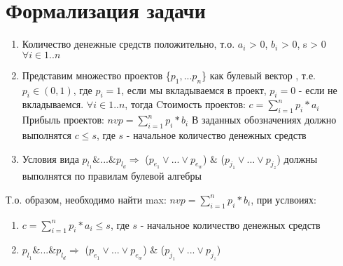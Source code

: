 \documentclass[a4paper,12pt]{article}
\begin{document}
\section{Формализация задачи}
\begin{enumerate}
\item 
Количество денежные средств положительно, т.о.
\newline   
${a_i}$ > 0, ${b_i}$ > 0, s > 0 $\forall i \in {1..n}$
\item 
Представим множество проектов  \{${p_{1},...p_{n}}$\} как булевый вектор \cite{discr_math}, т.е. $p_{i} \in (0, 1)$, где $p_{i} = 1$, если мы вкладываемся в проект,  $p_{i} = 0$ - если не вкладываемся. $\forall i \in {1..n}$, тогда 
\newline Cтоимость проектов: $c = \sum_{i=1}^{n} p_{i} * {a_i}$
\newline Прибыль проектов: $nvp = \sum_{i=1}^{n} p_{i} * {b_i}$
\newline В заданных обозначениях должно выполнятся $ c \leq s $, где $s$ - начальное количество денежных средств
\item 
Условия вида \newline
${p_{l_1} \& ...\& p_{l_d}} \Rightarrow$ (${p_{e_1}\vee ... \vee p_{e_w}}$) $ \& $ (${p_{j_1}\vee ...\vee p_{j_z}}$)
должны выполнятся по правилам булевой алгебры \cite{discr_math}
\end{enumerate}
Т.о. образом, необходимо найти max: $nvp = \sum_{i=1}^{n} p_{i} * {b_i}$, при услвоиях:
\begin{enumerate}
\item
$c = \sum_{i=1}^{n} p_{i} * {a_i} \leq s$, где $s$ - начальное количество денежных средств
\item
${p_{l_1} \& ...\& p_{l_d}} \Rightarrow$ (${p_{e_1}\vee ... \vee p_{e_w}}$) $ \& $ (${p_{j_1}\vee ...\vee p_{j_z}}$)	
\end{enumerate}
\end{document}
